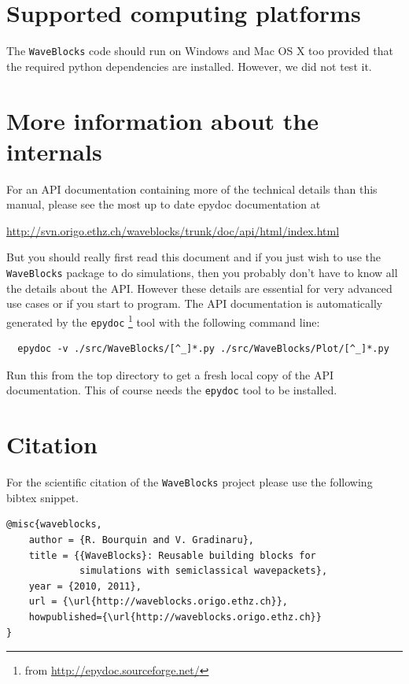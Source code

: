 \documentclass[a4paper,10pt]{report}
\begin{document}
\section{Supported computing platforms}

The \texttt{WaveBlocks} code should run on Windows and Mac OS X too provided
that the required python dependencies are installed. However, we did not test it.

\section{More information about the internals}

For an API documentation containing more of the technical details than this
manual, please see the most up to date epydoc documentation at

\begin{center}
  \url{http://svn.origo.ethz.ch/waveblocks/trunk/doc/api/html/index.html}
\end{center}

But you should really first read this document and if you just wish to use the
\texttt{WaveBlocks} package to do simulations, then you probably don't
have to know all the details about the API. However these details are
essential for very advanced use cases or if you start to program. The
API documentation is automatically generated by the \texttt{epydoc}
\footnote{from \url{http://epydoc.sourceforge.net/}} tool with the following
command line:

\begin{verbatim}
  epydoc -v ./src/WaveBlocks/[^_]*.py ./src/WaveBlocks/Plot/[^_]*.py
\end{verbatim}

Run this from the top directory to get a fresh local copy of the API documentation.
This of course needs the \texttt{epydoc} tool to be installed.

\section{Citation}

For the scientific citation of the \texttt{WaveBlocks} project please
use the following bibtex snippet.

\begin{verbatim}
@misc{waveblocks,
    author = {R. Bourquin and V. Gradinaru},
    title = {{WaveBlocks}: Reusable building blocks for
             simulations with semiclassical wavepackets},
    year = {2010, 2011},
    url = {\url{http://waveblocks.origo.ethz.ch}},
    howpublished={\url{http://waveblocks.origo.ethz.ch}}
}
\end{verbatim}
\end{document}
